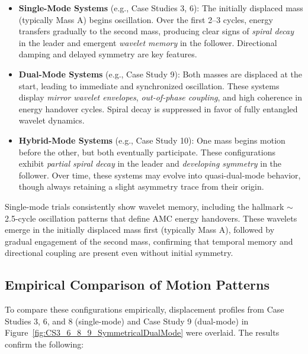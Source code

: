 \documentclass[10pt,aps,pre,onecolumn,superscriptaddress,notitlepage]{revtex4-2}
\begin{document}
\begin{itemize}
  \item \textbf{Single-Mode Systems} (e.g., Case Studies 3, 6):  
  The initially displaced mass (typically Mass A) begins oscillation. Over the first 2--3 cycles, energy transfers gradually to the second mass, producing clear signs of \textit{spiral decay} in the leader and emergent \textit{wavelet memory} in the follower. Directional damping and delayed symmetry are key features.

  \item \textbf{Dual-Mode Systems} (e.g., Case Study 9):  
  Both masses are displaced at the start, leading to immediate and synchronized oscillation. These systems display \textit{mirror wavelet envelopes}, \textit{out-of-phase coupling}, and high coherence in energy handover cycles. Spiral decay is suppressed in favor of fully entangled wavelet dynamics.

  \item \textbf{Hybrid-Mode Systems} (e.g., Case Study 10):  
  One mass begins motion before the other, but both eventually participate. These configurations exhibit \textit{partial spiral decay} in the leader and \textit{developing symmetry} in the follower. Over time, these systems may evolve into quasi-dual-mode behavior, though always retaining a slight asymmetry trace from their origin.
\end{itemize}

Single-mode trials consistently show wavelet memory, including the hallmark $\sim$2.5-cycle oscillation patterns that define AMC energy handovers. These wavelets emerge in the initially displaced mass first (typically Mass A), followed by gradual engagement of the second mass, confirming that temporal memory and directional coupling are present even without initial symmetry.

\subsection{Empirical Comparison of Motion Patterns}
To compare these configurations empirically, displacement profiles from Case Studies 3, 6, and 8 (single-mode) and Case Study 9 (dual-mode) in Figure~\ref{fig:CS3_6_8_9_SymmetricalDualMode} were overlaid. The results confirm the following:
\end{document}
